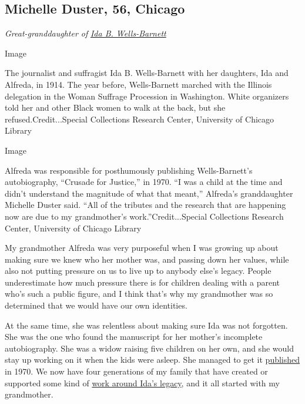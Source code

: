 \hypertarget{michelle-duster-56-chicago}{%
\subsection{Michelle Duster, 56,
Chicago}\label{michelle-duster-56-chicago}}

\emph{Great-granddaughter of}
\href{https://www.nytimes3xbfgragh.onion/interactive/2018/obituaries/overlooked-ida-b-wells.html}{\emph{Ida
B. Wells-Barnett}}

Image

The journalist and suffragist Ida B. Wells-Barnett with her daughters,
Ida and Alfreda, in 1914. The year before, Wells-Barnett marched with
the Illinois delegation in the Woman Suffrage Procession in Washington.
White organizers told her and other Black women to walk at the back, but
she refused.Credit...Special Collections Research Center, University of
Chicago Library

Image

Alfreda was responsible for posthumously publishing Wells-Barnett's
autobiography, ``Crusade for Justice,'' in 1970. ``I was a child at the
time and didn't understand the magnitude of what that meant,'' Alfreda's
granddaughter Michelle Duster said. ``All of the tributes and the
research that are happening now are due to my grandmother's
work.''Credit...Special Collections Research Center, University of
Chicago Library

My grandmother Alfreda was very purposeful when I was growing up about
making sure we knew who her mother was, and passing down her values,
while also not putting pressure on us to live up to anybody else's
legacy. People underestimate how much pressure there is for children
dealing with a parent who's such a public figure, and I think that's why
my grandmother was so determined that we would have our own identities.

At the same time, she was relentless about making sure Ida was not
forgotten. She was the one who found the manuscript for her mother's
incomplete autobiography. She was a widow raising five children on her
own, and she would stay up working on it when the kids were asleep. She
managed to get it
\href{https://press.uchicago.edu/ucp/books/book/chicago/C/bo49856620.html}{published}
in 1970. We now have four generations of my family that have created or
supported some kind of
\href{https://www.simonandschuster.com/books/Ida-B-the-Queen/Michelle-Duster/9781982129811}{work
around Ida's legacy}, and it all started with my grandmother.

